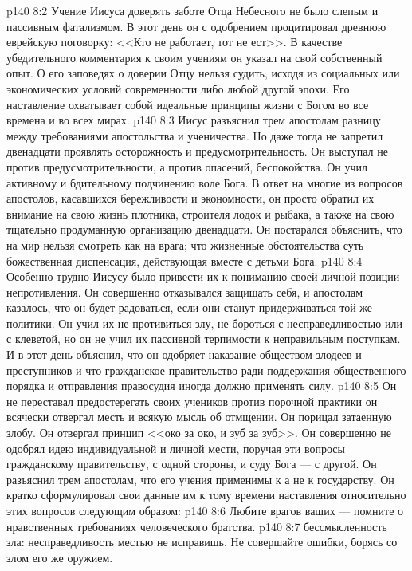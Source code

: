 \vs p140 8:2 \bibnobreakspace {} Учение Иисуса доверять заботе Отца Небесного не было слепым и пассивным фатализмом. В этот день он с одобрением процитировал древнюю еврейскую поговорку: <<Кто не работает, тот не ест>>. В качестве убедительного комментария к своим учениям он указал на свой собственный опыт. О его заповедях о доверии Отцу нельзя судить, исходя из социальных или экономических условий современности либо любой другой эпохи. Его наставление охватывает собой идеальные принципы жизни с Богом во все времена и во всех мирах.
\vs p140 8:3 Иисус разъяснил трем апостолам разницу между требованиями апостольства и ученичества. Но даже тогда не запретил двенадцати проявлять осторожность и предусмотрительность. Он выступал не против предусмотрительности, а против опасений, беспокойства. Он учил активному и бдительному подчинению воле Бога. В ответ на многие из вопросов апостолов, касавшихся бережливости и экономности, он просто обратил их внимание на свою жизнь плотника, строителя лодок и рыбака, а также на свою тщательно продуманную организацию двенадцати. Он постарался объяснить, что на мир нельзя смотреть как на врага; что жизненные обстоятельства суть божественная диспенсация, действующая вместе с детьми Бога.
\vs p140 8:4 Особенно трудно Иисусу было привести их к пониманию своей личной позиции непротивления. Он совершенно отказывался защищать себя, и апостолам казалось, что он будет радоваться, если они станут придерживаться той же политики. Он учил их не противиться злу, не бороться с несправедливостью или с клеветой, но он не учил их пассивной терпимости к неправильным поступкам. И в этот день объяснил, что он одобряет наказание обществом злодеев и преступников и что гражданское правительство ради поддержания общественного порядка и отправления правосудия иногда должно применять силу.
\vs p140 8:5 Он не переставал предостерегать своих учеников против порочной практики  он всячески отвергал месть и всякую мысль об отмщении. Он порицал затаенную злобу. Он отвергал принцип <<око за око, и зуб за зуб>>. Он совершенно не одобрял идею индивидуальной и личной мести, поручая эти вопросы гражданскому правительству, с одной стороны, и суду Бога --- с другой. Он разъяснил трем апостолам, что его учения применимы к  а не к государству. Он кратко сформулировал свои данные им к тому времени наставления относительно этих вопросов следующим образом:
\vs p140 8:6 Любите врагов ваших --- помните о нравственных требованиях человеческого братства.
\vs p140 8:7 бессмысленность зла: несправедливость местью не исправишь. Не совершайте ошибки, борясь со злом его же оружием.
